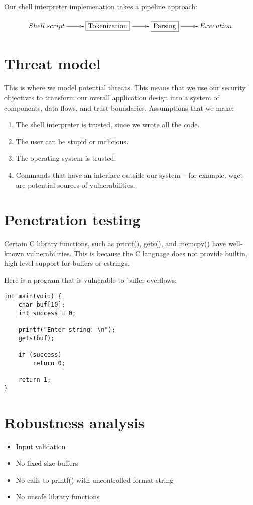 \documentclass[12pt]{article}
\begin{document}
Our shell interpreter implemenation takes a pipeline approach:

\begin{displaymath}
\xymatrix{
Shell \: script \ar[r] & \framebox{Tokenization} \ar[r] & \framebox{Parsing} \ar[r] & Execution
}
\end{displaymath}

\section{Threat model}
This is where we model potential threats. This means that we use our security objectives to transform our overall application design into a system of components, data flows, and trust boundaries. Assumptions that we make:

\begin{enumerate}
  \item The shell interpreter is trusted, since we wrote all the code.
  \item The user can be stupid or malicious.
  \item The operating system is trusted.
  \item Commands that have an interface outside our system -- for example, wget -- are potential sources of vulnerabilities.
\end{enumerate}



\section{Penetration testing}
Certain C library functions, such as printf(), gets(), and memcpy() have well-known vulnerabilities\cite{formatstring,smashingthestack}. This is because the C language does not provide builtin, high-level support for buffers or cstrings. 

Here is a program that is vulnerable to buffer overflows:
\begin{lstlisting}[frame=single]
int main(void) {
    char buf[10];
    int success = 0;
    
    printf("Enter string: \n");
    gets(buf);

    if (success)
        return 0;

    return 1;
}
\end{lstlisting}


\section{Robustness analysis}
\begin{itemize}
  \item Input validation
  \item No fixed-size buffers
  \item No calls to printf() with uncontrolled format string
  \item No unsafe library functions
\end{itemize}
\end{document}
